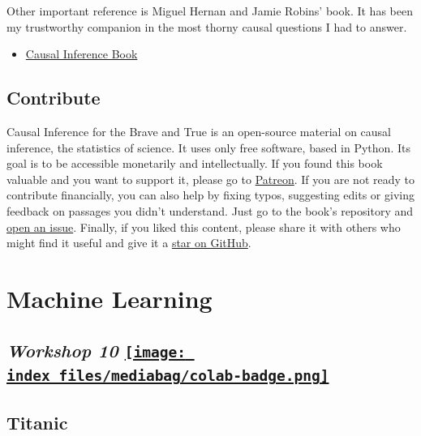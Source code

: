 \documentclass[
  letterpaper,
  DIV=11,
  numbers=noendperiod]{scrreprt}
\providecommand{\tightlist}{%
  \setlength{\itemsep}{0pt}\setlength{\parskip}{0pt}}\usepackage{longtable,booktabs,array}
\begin{document}
Other important reference is Miguel Hernan and Jamie Robins' book. It
has been my trustworthy companion in the most thorny causal questions I
had to answer.

\begin{itemize}
\tightlist
\item
  \href{https://www.hsph.harvard.edu/miguel-hernan/causal-inference-book/}{Causal
  Inference Book}
\end{itemize}

\hypertarget{contribute}{%
\section{Contribute}\label{contribute}}

Causal Inference for the Brave and True is an open-source material on
causal inference, the statistics of science. It uses only free software,
based in Python. Its goal is to be accessible monetarily and
intellectually. If you found this book valuable and you want to support
it, please go to
\href{https://www.patreon.com/causal_inference_for_the_brave_and_true}{Patreon}.
If you are not ready to contribute financially, you can also help by
fixing typos, suggesting edits or giving feedback on passages you didn't
understand. Just go to the book's repository and
\href{https://github.com/matheusfacure/python-causality-handbook/issues}{open
an issue}. Finally, if you liked this content, please share it with
others who might find it useful and give it a
\href{https://github.com/matheusfacure/python-causality-handbook/stargazers}{star
on GitHub}.


\hypertarget{machine-learning}{%
\chapter{Machine Learning}\label{machine-learning}}

\hypertarget{workshop-10-open-in-colab}{%
\section[\emph{Workshop 10} ]{\texorpdfstring{\emph{Workshop 10}
\href{https://colab.research.google.com/github/oballinger/QM2/blob/main/notebooks/W10.\%20Machine\%20Learning.ipynb}{\protect\texttt{[image: index\_files/mediabag/colab-badge.png]}}}{Workshop 10 Open In Colab}}\label{workshop-10-open-in-colab}}

\hypertarget{titanic}{%
\section{Titanic}\label{titanic}}
\end{document}
